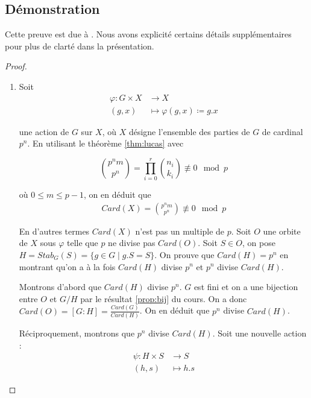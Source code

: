 \documentclass{article}
\theoremstyle{definition}
\theoremstyle{plain}
\theoremstyle{plain}
\theoremstyle{plain}
\theoremstyle{plain}
\theoremstyle{definition}
\theoremstyle{plain}
\theoremstyle{plain}
\begin{document}
\subsection{Démonstration}

Cette preuve est due à \cite[p.~216-218]{chen2024napkin}. Nous avons explicité certains détails supplémentaires pour plus de clarté dans la présentation.
\begin{proof}
	\begin{enumerate}[label={\upshape(\roman*)}]
	\item Soit
\begin{align*}
	\varphi : G \times X &\to X \\
	(g,x) &\mapsto \varphi(g,x) \coloneq g.x
\end{align*}

une action de \( G \) sur \( X \), où \( X \) désigne l'ensemble des parties de \( G \) de cardinal \( p^{n} \). En utilisant le théorème \ref{thm:lucas} avec 

\begin{equation*}
	\binom{p^{n}m}{p^{n}} = \prod_{i=0}^{r} \binom{n_i}{k_i} \not\equiv 0 \mod p
\end{equation*}

où \( 0 \leq m \leq p-1 \), on en déduit que 
\begin{align*}
	Card(X) = \binom{p^{n}m}{p^{n}} \not\equiv 0 \mod p 
\end{align*}

En d'autres termes \( Card(X) \) n'est pas un multiple de \( p \).
Soit \( O \) une orbite de \( X \) sous \( \varphi \) telle que \( p \) ne divise pas \( Card(O) \). Soit \( S \in O \), on pose \( H = Stab_{G}({S}) = \{ g \in G \mid g.S = S \} \).
On prouve que \( Card(H) = p^{n} \) en montrant qu'on a à la fois \( Card(H) \) divise \( p^{n} \) et \( p^{n} \) divise \(Card(H) \).

\par Montrons d'abord que \( Card(H) \) divise \( p^{n} \). \( G \) est fini et on a une bijection entre \( O \) et \( G/H \) par le résultat \ref{prop:bij} du cours. On a donc \( Card(O) = [G : H]  = \frac{Card(G)}{Card(H)} \). On en déduit que \( p^{n} \) divise \( Card(H) \).

\par Réciproquement, montrons que \( p^{n} \) divise \(Card(H)\). Soit une nouvelle action :
\begin{align*}
	\psi : H \times S &\to S \\
	(h,s) &\mapsto h.s
\end{align*}


\end{enumerate}
\end{proof}
\end{document}
